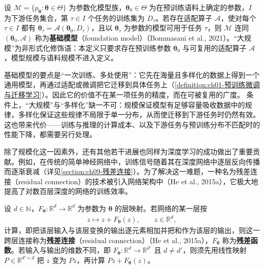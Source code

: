 \documentclass[../../main.tex]{subfiles}
\begin{document}
\begin{definition}[基础模型]\label{definition:ch01-基础模型}
设 $\mathcal{M}=\{p_{\boldsymbol{\theta}}:\boldsymbol{\theta}\in\Theta\}$ 为参数化模型族，$\boldsymbol{\theta}_{0}\in\Theta$ 为在预训练语料上确定的参数，$I$ 为下游任务集合，第 $\tau\in I$ 个任务的训练集为 $D_{\tau}$。若存在适配算子 $\mathcal{A}$，使对每个 $\tau\in I$ 都有 $\boldsymbol{\theta}_{\tau}=\mathcal{A}(\boldsymbol{\theta}_{0},D_{\tau})$，且以 $\boldsymbol{\theta}_{\tau}$ 为参数的模型可用于任务 $\tau$，则 $\mathcal{M}$ 连同 $(\boldsymbol{\theta}_{0},\mathcal{A})$ 称为\textbf{基础模型}（foundation model）（Bommasani et al., 2021）。“大规模”为非形式化修饰语：本定义只要求存在预训练参数 $\boldsymbol{\theta}_{0}$ 与可复用的适配算子 $\mathcal{A}$，模型规模与语料规模不进入定义。
\end{definition}

\begin{remark}
基础模型的要点是“一次训练、多处使用”：它先在海量且多样化的数据上得到一个通用模型，再通过适配或微调把它迁移到具体任务上（\cref{definition:ch01-预训练微调与迁移学习}）。因此它的价值不在某一项任务的精度，而在可被复用的广度。
条件上，“大规模”与“多样化”缺一不可：规模保证模型有足够容量吸收数据中的规律，多样化保证这些规律不局限于单一分布，从而使迁移到下游任务时仍然有效。这也带来代价——训练与推理的计算成本、以及下游任务与预训练分布不匹配时的性能下降，都需要另行处理。
\end{remark}

除了规模化这一因素外，还有其他若干进展也同样为深度学习的成功做出了重要贡献。例如，在传统的简单神经网络中，训练信号随着其在深度网络中逐层反向传播而逐渐衰减（详见\cref{section:ch09-残差连接}）。为了解决这一难题，一种名为残差连接（residual connection）的技术被引入网络架构中（He et al., 2015a），它极大地提高了对数百层深度的网络的训练效率。

\begin{definition}[残差连接]\label{definition:ch01-残差连接}
设 $d\in\mathbb{N}$，$F_{\boldsymbol{\theta}}:\mathbb{R}^{d}\to\mathbb{R}^{d}$ 为参数为 $\boldsymbol{\theta}$ 的层映射。若网络的某一层按
\begin{align*}
  z\mapsto z+F_{\boldsymbol{\theta}}(z),\qquad z\in\mathbb{R}^{d},
\end{align*}
计算，即把该层输入与该层变换的输出逐元素相加并把和作为该层的输出，则这一跨层连接称为\textbf{残差连接}（residual connection）（He et al., 2015a），$F_{\boldsymbol{\theta}}$ 称为\textbf{残差函数}。若输入与输出的维数不同，即 $F_{\boldsymbol{\theta}}:\mathbb{R}^{d}\to\mathbb{R}^{d'}$ 且 $d\neq d'$，则须先用线性映射 $P\in\mathbb{R}^{d'\times d}$ 把 $z$ 变为 $Pz$，再计算 $Pz+F_{\boldsymbol{\theta}}(z)$。
\end{definition}
\end{document}
